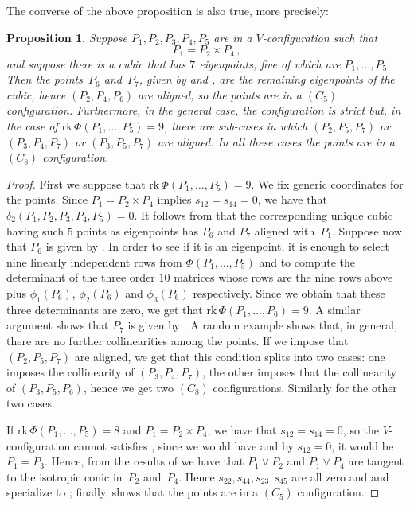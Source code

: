 \documentclass{amsart}
\theoremstyle{plain}
\newtheorem{prop}[lemma]{Proposition}
\theoremstyle{definition}
\newcommand{\rk}{\ensuremath{\mathrm{rk}}}
\begin{document}
%
The converse of the above proposition is also true, more precisely:
\begin{prop}
   Suppose $P_1, P_2, P_3, P_4, P_5$ are in a $V$-configuration such that
%
\[
  P_1 = P_2 \times P_4 \,,
\]
%
and suppose there is a cubic that has $7$ eigenpoints, five of which are $P_1, \dotsc, P_5$. Then the points~$P_6$ and~$P_7$, given by  and , are the remaining eigenpoints of the cubic, hence $(P_2, P_4, P_6)$ are aligned, so the points are in a $(C_5)$ configuration. Furthermore, in the general case, the configuration is 
strict but, in the case of $\rk \, \Phi(P_1, \dotsc, P_5) = 9$, there are sub-cases in which $(P_2, P_5, P_7)$ or $(P_3, P_4, P_7)$ or $(P_3, P_5, P_7)$ are aligned. In all these cases the points are in a $(C_8)$ configuration.
\end{prop}
%
\begin{proof}
    First we suppose that $\rk \, \Phi(P_1, \dotsc, P_5) = 9$. We fix generic coordinates for the points. Since $P_1 = P_2 \times P_4$ implies $s_{12}=s_{14}=0$, we have that $\delta_2 (P_1,P_2,P_3,P_4,P_5)=0$. It follows from  that the corresponding unique cubic having such $5$ points as eigenpoints has $P_6$ and $P_7$ aligned with~$P_1$. Suppose now that $P_6$ is given by . In order to see if it is an eigenpoint, it is enough to select nine linearly independent rows from $\Phi(P_1, \dotsc, P_5)$
and to compute the determinant of the three order $10$ matrices whose rows are the nine rows above plus $\phi_1(P_6)$, $\phi_2(P_6)$ and 
$\phi_3(P_6)$ respectively. Since we obtain that these three determinants are zero, we get that $\rk \, \Phi(P_1, \dotsc, P_6) = 9$. A similar argument shows that $P_7$ is given by . A random example shows that, in general, there are no further collinearities among the points. If we impose that $(P_2, P_5, P_7)$ are aligned, we get that this condition splits into two cases: one imposes the collinearity of $(P_3, P_4, P_7)$, the other imposes that the collinearity of $(P_3, P_5, P_6)$, hence we get two $(C_8)$ configurations. Similarly for the other two cases. 

If $\rk \, \Phi(P_1, \dotsc, P_5) = 8$ and $P_1 = P_2 \times P_4$, we have that $s_{12} = s_{14} = 0$, so the $V$-configuration cannot satisfies , since we would have  and by $s_{12} = 0$, it would be $P_1 = P_3$. Hence,
from the results of  we have that $P_1 \vee P_2$ and $P_1 \vee P_4$ are tangent to the isotropic conic in~$P_2$ and~$P_4$. Hence $s_{22}, s_{44}, s_{23}, s_{45}$ are all zero and  and  specialize to ; finally,  shows that the points are in a $(C_5)$ configuration.
\end{proof}
%
\end{document}
